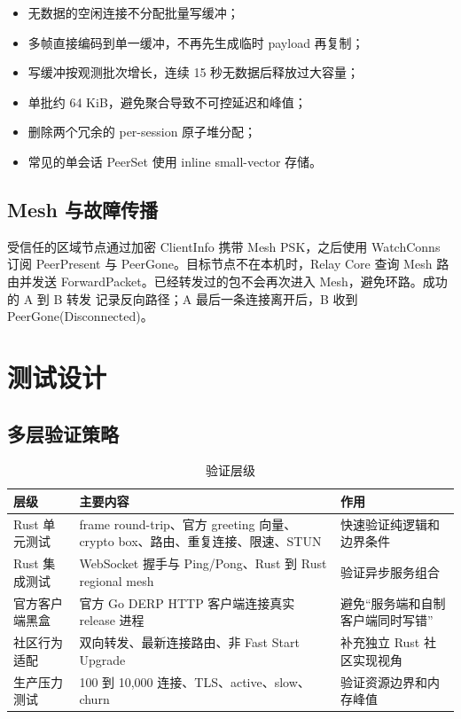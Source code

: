 \documentclass[UTF8,a4paper,zihao=-4]{ctexart}
\begin{document}
\begin{itemize}
  \item 无数据的空闲连接不分配批量写缓冲；
  \item 多帧直接编码到单一缓冲，不再先生成临时 payload 再复制；
  \item 写缓冲按观测批次增长，连续 15 秒无数据后释放过大容量；
  \item 单批约 64 KiB，避免聚合导致不可控延迟和峰值；
  \item 删除两个冗余的 per-session 原子堆分配；
  \item 常见的单会话 PeerSet 使用 inline small-vector 存储。
\end{itemize}

\subsection{Mesh 与故障传播}

受信任的区域节点通过加密 ClientInfo 携带 Mesh PSK，之后使用 WatchConns 订阅
PeerPresent 与 PeerGone。目标节点不在本机时，Relay Core 查询 Mesh 路由并发送
ForwardPacket。已经转发过的包不会再次进入 Mesh，避免环路。成功的 A 到 B 转发
记录反向路径；A 最后一条连接离开后，B 收到 PeerGone(Disconnected)。

\section{测试设计}

\subsection{多层验证策略}

\begin{table}[htbp]
\centering
\small
\begin{tabularx}{\textwidth}{p{}Y Y}
\toprule
\textbf{层级} & \textbf{主要内容} & \textbf{作用} \\
\midrule
Rust 单元测试 &
frame round-trip、官方 greeting 向量、crypto box、路由、重复连接、限速、STUN &
快速验证纯逻辑和边界条件 \\
Rust 集成测试 &
WebSocket 握手与 Ping/Pong、Rust 到 Rust regional mesh &
验证异步服务组合 \\
官方客户端黑盒 &
官方 Go DERP HTTP 客户端连接真实 release 进程 &
避免“服务端和自制客户端同时写错” \\
社区行为适配 &
双向转发、最新连接路由、非 Fast Start Upgrade &
补充独立 Rust 社区实现视角 \\
生产压力测试 &
100 到 10,000 连接、TLS、active、slow、churn &
验证资源边界和内存峰值 \\
\bottomrule
\end{tabularx}
\caption{验证层级}
\end{table}
\end{document}
